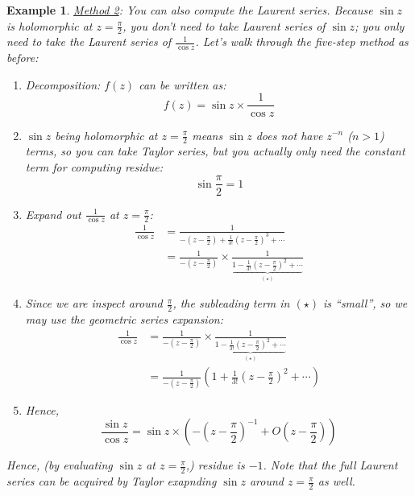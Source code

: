 \documentclass[a4paper]{article}
\newtheorem{example}{Example}
\begin{document}
\begin{example}
    \underline{Method 2}: You can also compute the Laurent series. Because $\sin z$ is holomorphic at $z=\frac{\pi}{2}$, you don't need to take Laurent series of $\sin z$; you only need to take the Laurent series of $\frac{1}{\cos z}$.
    Let's walk through the five-step method as before:
    \begin{enumerate}
        \item Decomposition: $f(z)$ can be written as:
            \begin{equation*}
                f(z) = \sin{z} \times \frac{1}{\cos{z}}
            \end{equation*}
        \item $\sin z$ being holomorphic at $z=\frac{\pi}{2}$ means $\sin z$ does not have $z^{-n}$ ($n > 1$) terms, so you can take Taylor series, but you actually only need the constant term for computing residue:
            \begin{equation*}
                \sin{\frac{\pi}{2}} = 1
            \end{equation*}
        \item Expand out $\frac{1}{\cos{z}}$ at $z=\frac{\pi}{2}$:
            \begin{align*}
                \frac{1}{\cos{z}} &= \frac{1}{-\left( z-\frac{\pi}{2} \right) + \frac{1}{3!}\left( z-\frac{\pi}{2} \right)^{3} + \cdots} \\
                &= \frac{1}{-\left( z-\frac{\pi}{2} \right)} \times \frac{1}{\underbrace{1 - \frac{1}{3!}\left( z-\frac{\pi}{2} \right)^2 + \cdots}_{(\star)}}
            \end{align*}
        \item Since we are inspect around $\frac{\pi}{2}$, the subleading term in $(\star)$ is ``small'', so we may use the geometric series expansion:
            \begin{align*}
                \frac{1}{\cos{z}} &= \frac{1}{-\left( z-\frac{\pi}{2} \right)} \times \frac{1}{\underbrace{1 - \frac{1}{3!}\left( z-\frac{\pi}{2} \right)^2 + \cdots}_{(\star)}} \\
                &= \frac{1}{-\left( z-\frac{\pi}{2} \right)} \left( 1 + \frac{1}{3!}\left( z-\frac{\pi}{2} \right)^2 + \cdots \right)
            \end{align*}
        \item Hence,
            \begin{equation*}
                \frac{\sin{z}}{\cos{z}} = \sin{z} \times \left( -\left( z-\frac{\pi}{2} \right)^{-1} + O\left( z-\frac{\pi}{2} \right) \right)
            \end{equation*}
    \end{enumerate}
    Hence, (by evaluating $\sin{z}$ at $z=\frac{\pi}{2}$,) residue is $-1$.
    Note that the full Laurent series can be acquired by Taylor exapnding $\sin z$ around $z=\frac{\pi}{2}$ as well.
\end{example}
\end{document}
